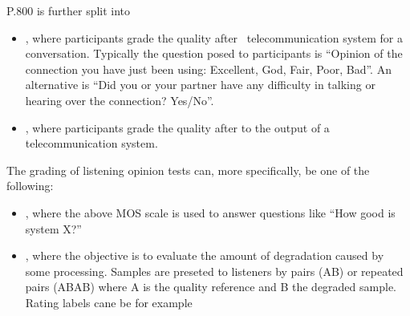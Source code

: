 \documentclass[letterpaper,10pt,english]{jupyterBook}
\begin{document}
\sphinxAtStartPar
P.800 is further split into
\begin{itemize}
\item {} 
\sphinxAtStartPar
{}, where participants grade the        quality after  telecommunication system for a        conversation. Typically the question posed to participants is        “Opinion of the connection you have just been using: Excellent,        God, Fair, Poor, Bad”. An alternative is “Did you or your        partner have any difficulty in talking or hearing over the        connection? Yes/No”.

\item {} 
\sphinxAtStartPar
{}, where participants grade the quality        after  to the output of a telecommunication system.

\end{itemize}

\sphinxAtStartPar
The grading of listening opinion tests can, more specifically, be    one of the following:
\begin{itemize}
\item {} 
\sphinxAtStartPar
{}, where the above MOS scale is        used to answer questions like “How good is system X?”

\item {} 
\sphinxAtStartPar
{}, where the objective is to        evaluate the amount of degradation caused by some processing.        Samples are preseted to listeners by pairs (A\sphinxhyphen{}B) or repeated        pairs (A\sphinxhyphen{}B\sphinxhyphen{}A\sphinxhyphen{}B) where A is the quality reference and B the        degraded sample. Rating labels cane be for example

\end{itemize}
\end{document}
